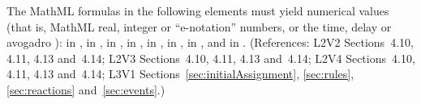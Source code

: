 The MathML formulas in the following elements must yield numerical
values (that is, MathML real, integer or ``e-notation'' numbers,
or the time, delay or avogadro ):  in \KineticLaw,
 in \SpeciesReference,  in
\InitialAssignment,  in \AssignmentRule,  in
\RateRule,  in \AlgebraicRule,  in \Event
\Delay, and  in \EventAssignment.  (References: L2V2
Sections~4.10, 4.11, 4.13 and~4.14; L2V3 Sections~4.10, 4.11, 4.13 
and~4.14; L2V4 Sections~4.10, 4.11, 4.13 and~4.14; L3V1 
Sections~\ref{sec:initialAssignment}, \ref{sec:rules}, 
\ref{sec:reactions} and~\ref{sec:events}.)


